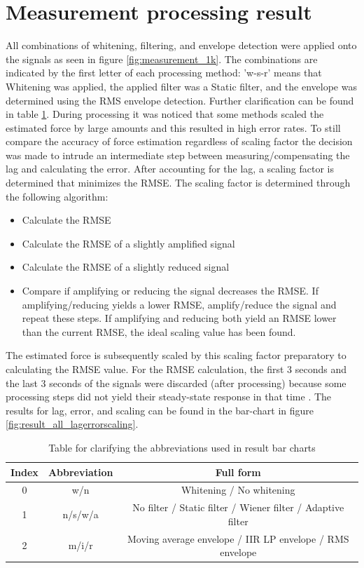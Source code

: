 \section{Measurement processing result}
All combinations of whitening, filtering, and envelope detection were applied onto the signals as seen in figure \ref{fig:measurement_1k}. The combinations are indicated by the first letter of each processing method: 'w-s-r' means that Whitening was applied, the applied filter was a Static filter, and the envelope was determined using the RMS envelope detection. Further clarification can be found in table \ref{tab:abbreviation_explanation}.
During processing it was noticed that some methods scaled the estimated force by large amounts and this resulted in high error rates. To still compare the accuracy of force estimation regardless of scaling factor the decision was made to intrude an intermediate step between measuring/compensating the lag and calculating the error. After accounting for the lag, a scaling factor is determined that minimizes the RMSE. The scaling factor is determined through the following algorithm:
\begin{itemize}
    \item Calculate the RMSE
    \item Calculate the RMSE of a slightly amplified signal
    \item Calculate the RMSE of a slightly reduced signal
    \item Compare if amplifying or reducing the signal decreases the RMSE. If amplifying/reducing yields a lower RMSE, amplify/reduce the signal and repeat these steps. If amplifying and reducing both yield an RMSE lower than the current RMSE, the ideal scaling value has been found.
\end{itemize}

The estimated force is subsequently scaled by this scaling factor preparatory to calculating the RMSE value. For the RMSE calculation, the first 3 seconds and the last 3 seconds of the signals were discarded (after processing) because some processing steps did not yield their steady-state response in that time \cite{transient_response}. The results for lag, error, and scaling can be found in the bar-chart in figure \ref{fig:result_all_lagerrorscaling}. 

\begin{table} [h!]
\begin{tabular}{ccc}
Index & Abbreviation & Full form \\
\hline
0 & w/n & Whitening / No whitening \\
1 & n/s/w/a & No filter / Static filter / Wiener filter / Adaptive filter \\
2 & m/i/r & Moving average envelope / IIR LP envelope / RMS envelope \\
\end{tabular}
\caption{Table for clarifying the abbreviations used in result bar charts}
\label{tab:abbreviation_explanation}
\end{table}

